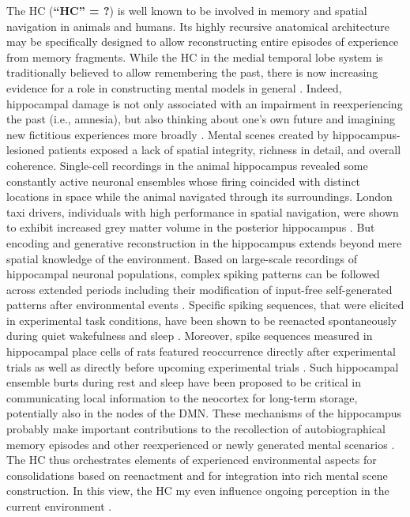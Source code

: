 \documentclass[10pt,letterpaper]{article}
\begin{document}
The HC (\textbf{``HC'' = ?}) is well known to be involved in memory and
spatial navigation in animals and humans.
Its highly recursive anatomical architecture
may be specifically designed to allow reconstructing
entire episodes of experience from memory fragments.
%
While the HC in the medial temporal lobe system
is traditionally believed to allow remembering the past,
there is now increasing evidence for a role
in constructing mental models in general
\citep{maguire2016, schacter2007remembering}.
Indeed,
hippocampal damage is
not only associated with an impairment in reexperiencing the past (i.e., amnesia),
but also thinking about one’s own future and
imagining new fictitious experiences more broadly \citep{hassabis2007patients}.
Mental scenes created by hippocampus-lesioned patients exposed a lack of
spatial integrity, richness in detail, and overall coherence.
%
Single-cell recordings in the animal hippocampus revealed
some constantly active neuronal ensembles whose firing coincided with
distinct locations in space while the animal navigated through its surroundings.
London taxi drivers, individuals with high performance in spatial navigation,
were shown to exhibit increased grey matter volume in the
posterior hippocampus \citep{maguire2000navigation}.
But encoding and generative reconstruction in the hippocampus extends
beyond mere spatial knowledge of the environment.
Based on large-scale recordings of hippocampal neuronal populations,
complex spiking patterns can be followed across extended periods including
their modification of input-free self-generated patterns
after environmental events \citep{buzsaki2004large}.
Specific spiking sequences, that were elicited in experimental task conditions,
have been shown to be reenacted spontaneously during
quiet wakefulness and sleep \citep{hartley2014space}.
Moreover, spike sequences measured in hippocampal place cells of rats
featured reoccurrence directly after experimental trials
as well as directly before upcoming experimental trials \citep{diba2007forward}.
Such hippocampal ensemble burts during rest and sleep
have been proposed to be critical in communicating local information
to the neocortex for long-term storage, potentially also in the nodes of the DMN.
These mechanisms of the hippocampus probably make important contributions to the
recollection of autobiographical memory episodes and other
reexperienced or newly generated mental scenarios
\citep{hassabis2007patients}.
%
The HC thus orchestrates elements of experienced environmental aspects for
consolidations based on reenactment and for integration into
rich mental scene construction. In this view, the HC my even influence
ongoing perception in the current environment
\citep{maguire2016}.
\end{document}
